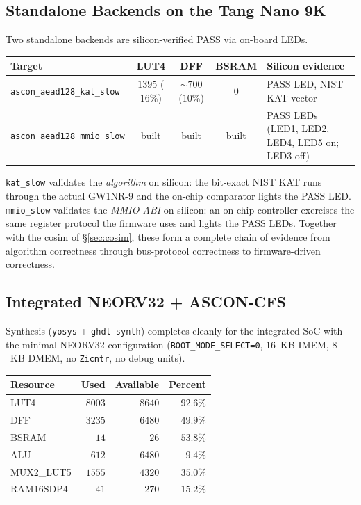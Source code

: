 \documentclass[11pt,a4paper]{article}
\begin{document}
\subsection{Standalone Backends on the Tang Nano 9K}

Two standalone backends are silicon-verified PASS via on-board LEDs.

\begin{center}
\begin{tabular}{lcccl}
\toprule
\rowcolor{tabhead!20}\textbf{Target} & \textbf{LUT4} & \textbf{DFF} & \textbf{BSRAM} & \textbf{Silicon evidence}\\
\midrule
\texttt{ascon\_aead128\_kat\_slow}  & $1395$ ($16\%$) & $\sim 700$ ($10\%$) & $0$ & PASS LED, NIST KAT vector\\
\texttt{ascon\_aead128\_mmio\_slow} & built & built & built & PASS LEDs (LED1, LED2, LED4, LED5 on; LED3 off)\\
\bottomrule
\end{tabular}
\end{center}

\texttt{kat\_slow} validates the \emph{algorithm} on silicon:
the bit-exact NIST KAT runs through the actual GW1NR-9 and the
on-chip comparator lights the PASS LED. \texttt{mmio\_slow}
validates the \emph{MMIO ABI} on silicon: an on-chip controller
exercises the same register protocol the firmware uses and lights
the PASS LEDs. Together with the cosim of §\ref{sec:cosim}, these
form a complete chain of evidence from algorithm correctness through
bus-protocol correctness to firmware-driven correctness.

\subsection{Integrated NEORV32 + ASCON-CFS}

Synthesis (\texttt{yosys} + \texttt{ghdl synth}) completes cleanly for
the integrated SoC with the minimal NEORV32 configuration
(\texttt{BOOT\_MODE\_SELECT=0}, $16$~KB IMEM, $8$~KB DMEM, no
\texttt{Zicntr}, no debug units).

\begin{center}
\begin{tabular}{lrrr}
\toprule
\rowcolor{tabhead!20}\textbf{Resource} & \textbf{Used} & \textbf{Available} & \textbf{Percent}\\
\midrule
LUT4               & $8003$ & $8640$ & $92.6\%$\\
DFF                & $3235$ & $6480$ & $49.9\%$\\
BSRAM              & $14$   & $26$   & $53.8\%$\\
ALU                & $612$  & $6480$ & $9.4\%$\\
MUX2\_LUT5         & $1555$ & $4320$ & $35.0\%$\\
RAM16SDP4          & $41$   & $270$  & $15.2\%$\\
\bottomrule
\end{tabular}
\end{center}
\end{document}
